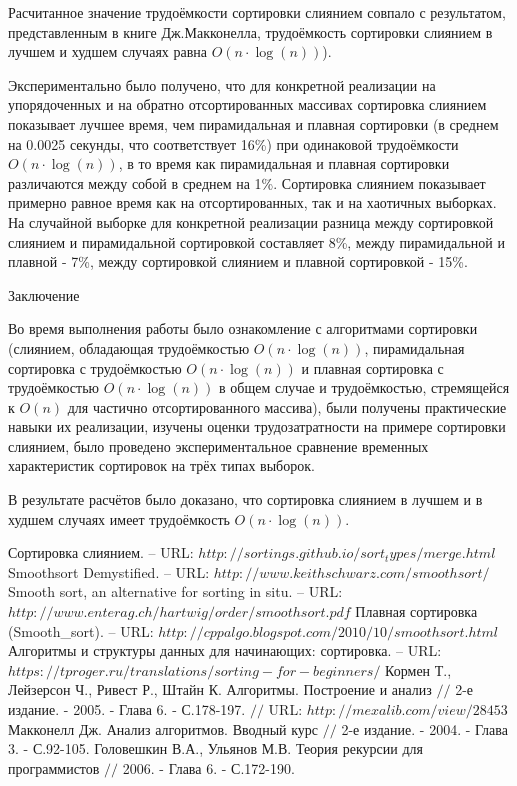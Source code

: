 \documentclass[12pt,a4paper]{scrartcl}
\begin{document}
Расчитанное значение трудоёмкости сортировки слиянием совпало с результатом, представленным в книге Дж.Макконелла, трудоёмкость сортировки слиянием в лучшем и худшем случаях равна $O(n\cdot \log(n))$).

Экспериментально было получено, что для конкретной реализации на упорядоченных и на обратно отсортированных массивах сортировка слиянием показывает лучшее время, чем пирамидальная и плавная сортировки (в среднем на 0.0025 секунды, что соответствует 16\%) при одинаковой трудоёмкости $O(n\cdot \log(n))$, в то время как пирамидальная и плавная сортировки различаются между собой в среднем на 1\%. Сортировка слиянием показывает примерно равное время как на отсортированных, так и на хаотичных выборках. На случайной выборке для конкретной реализации разница между сортировкой слиянием и пирамидальной сортировкой составляет 8\%, между пирамидальной и плавной - 7\%, между сортировкой слиянием и плавной сортировкой - 15\%.
\newpage
{}
\begin{center}
Заключение
\end{center}

Во время выполнения работы было ознакомление с алгоритмами сортировки (слиянием, обладающая трудоёмкостью $O(n\cdot \log(n))$, пирамидальная сортировка с трудоёмкостью $O(n\cdot \log(n))$ и плавная сортировка с трудоёмкостью $O(n\cdot \log(n))$ в общем случае и трудоёмкостью, стремящейся к $O(n)$ для частично отсортированного массива), были получены практические навыки их реализации, изучены оценки трудозатратности на примере сортировки слиянием, было проведено экспериментальное сравнение временных характеристик сортировок на трёх типах выборок.

В результате расчётов было доказано, что сортировка слиянием в лучшем и в худшем случаях имеет трудоёмкость $O(n\cdot \log(n))$.

\newpage
{}
\begin{thebibliography}{00} %

Сортировка слиянием. -- URL: $http://sortings.github.io/sort_types/merge.html$ 
Smoothsort Demystified. -- URL: $http://www.keithschwarz.com/smoothsort/$ 
Smooth sort, an alternative for sorting in situ. -- URL: $http://www.enterag.ch/hartwig/order/smoothsort.pdf$ 
Плавная сортировка (Smooth\_sort). -- URL: $http://cppalgo.blogspot.com/2010/10/smoothsort.html$ 
Алгоритмы и структуры данных для начинающих: сортировка. -- URL: $https://tproger.ru/translations/sorting-for-beginners/$ 
Кормен Т., Лейзерсон Ч., Ривест Р., Штайн К. Алгоритмы. Построение и анализ $//$ 2-е издание. - 2005. - Глава 6. - С.178-197. $//$ URL: $http://mexalib.com/view/28453$ 
Макконелл Дж. Анализ алгоритмов. Вводный курс $//$ 2-е издание. - 2004. - Глава 3. - С.92-105.
Головешкин В.А., Ульянов М.В. Теория рекурсии для программистов $//$ 2006. - Глава 6. - С.172-190.
\end{thebibliography}
\end{document}
